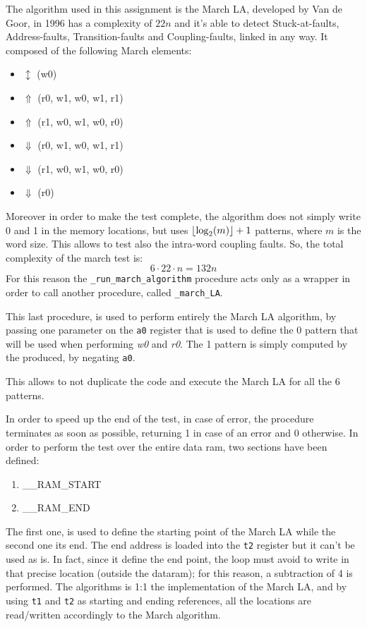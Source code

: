 \documentclass[paper=a4, fontsize=10pt]{scrartcl}	%
\DeclarePairedDelimiter\floor{\lfloor}{\rfloor}
\begin{document}
	The algorithm used in this assignment is the March LA, developed by Van de Goor, in 1996 has a complexity of $22n$ and it's able to detect Stuck-at-faults, Address-faults, Transition-faults and Coupling-faults, linked in any way. It composed of the following March elements:
	\begin{itemize}
		\itemsep0sp
		\item $\updownarrow$ (w0)
		\item $\Uparrow$ (r0, w1, w0, w1, r1)
		\item $\Uparrow$ (r1, w0, w1, w0, r0)
		\item $\Downarrow$ (r0, w1, w0, w1, r1)
		\item $\Downarrow$ (r1, w0, w1, w0, r0)
		\item $\Downarrow$ (r0)
	\end{itemize}
	Moreover in order to make the test complete, the algorithm does not simply write 0 and 1 in the memory locations, but uses $ \floor*{\log_2(m)} + 1$ patterns, where $m$ is the word size. This allows to test also the intra-word coupling faults. So, the total complexity of the march test is:
	\[
		6 \cdot 22 \cdot n = 132n
	\]
	For this reason the \texttt{\_run\_march\_algorithm} procedure acts only as a wrapper in order to call another procedure, called \texttt{\_march\_LA}.
	
	This last procedure, is used to perform entirely the March LA algorithm, by passing one parameter on the \texttt{a0} register that is used to define the 0 pattern that will be used when performing \textit{w0} and \textit{r0}. The 1 pattern is simply computed by the produced, by negating \texttt{a0}.
	
	This allows to not duplicate the code and execute the March LA for all the 6 patterns. 
	
	In order to speed up the end of the test, in case of error, the procedure terminates as soon as possible, returning 1 in case of an error and 0 otherwise.\newline\newline
	In order to perform the test over the entire data ram, two sections have been defined:
	\begin{enumerate}
		\itemsep0sp
		\item \_\_RAM\_START
		\item \_\_RAM\_END
	\end{enumerate}
	The first one, is used to define the starting point of the March LA while the second one its end. The end address is loaded into the \texttt{t2} register but it can't be used as is. In fact, since it define the end point, the loop must avoid to write in that precise location (outside the dataram); for this reason, a subtraction of 4 is performed.
	The algorithms is 1:1 the implementation of the March LA, and by using \texttt{t1} and \texttt{t2} as starting and ending references, all the locations are read/written accordingly to the March algorithm.
	
\end{document}
